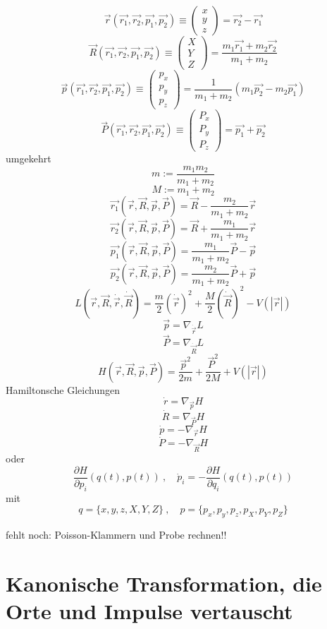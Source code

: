 \documentclass[10pt]{article} %
\begin{document}
\[ \vec{r}(\vec{r_1},\vec{r_2},\vec{p_1},\vec{p_2}) \equiv \begin{pmatrix} x \\ y \\ z \end{pmatrix} = \vec{r_2} - \vec{r_1} \]
\[ \vec{R}(\vec{r_1},\vec{r_2},\vec{p_1},\vec{p_2}) \equiv \begin{pmatrix} X \\ Y \\ Z \end{pmatrix} = \frac {m_1\vec{r_1} + m_2\vec{r_2}} {m_1 + m_2} \]
\[ \vec{p}(\vec{r_1},\vec{r_2},\vec{p_1},\vec{p_2}) \equiv \begin{pmatrix} p_x \\ p_y \\ p_z \end{pmatrix} = \frac{1}{m_1+m_2} ( m_1\vec{p_2} - m_2\vec{p_1}) \]
\[ \vec{P}(\vec{r_1},\vec{r_2},\vec{p_1},\vec{p_2}) \equiv \begin{pmatrix} P_x \\ P_y \\ P_z \end{pmatrix} = \vec{p_1} + \vec{p_2} \]
umgekehrt
\[ m := \frac{m_1 m_2}{m_1 + m_2} \]
\[ M := m_1 + m_2 \]
\[ \vec{r_1}(\vec{r},\vec{R},\vec{p},\vec{P}) = \vec{R} - \frac{m_2}{m_1 + m_2}\vec{r} \]
\[ \vec{r_2}(\vec{r},\vec{R},\vec{p},\vec{P}) = \vec{R} + \frac{m_1}{m_1 + m_2}\vec{r} \]
\[ \vec{p_1}(\vec{r},\vec{R},\vec{p},\vec{P}) = \frac{m_1}{m_1 + m_2}\vec{P} - \vec{p} \]
\[ \vec{p_2}(\vec{r},\vec{R},\vec{p},\vec{P}) = \frac{m_2}{m_1 + m_2}\vec{P} + \vec{p} \]
\[
L(\vec{r},\vec{R},\dot{\vec{r}},\dot{\vec{R}}) = 
\frac{m}{2}(\dot{\vec{r}})^2 +  \frac{M}{2}(\dot{\vec{R}})^2
- V(\left| \vec{r} \right|)
\]
\[ \vec{p} = \nabla _{\dot{\vec{r}}} L \]
\[ \vec{P} = \nabla _{\dot{\vec{R}}} L \]
\[
H(\vec{r},\vec{R},\vec{p},\vec{P}) = 
\frac{\vec{p}^2}{2m} +  \frac{\vec{P}^2}{2M}
+ V(\left| \vec{r} \right|)
\]
Hamiltonsche Gleichungen
\[ \dot{r} = \nabla_{\vec{p}} H \]
\[ \dot{R} = \nabla_{\vec{P}} H \]
\[ \dot{p} = - \nabla_{\vec{r}} H \]
\[ \dot{P} = - \nabla_{\vec{R}} H \]
oder
\[ \frac{\partial H}{\partial p_{i}}(q(t),p(t))\ ,\quad \dot{p}_{i}=-\frac{\partial H}{\partial q_{i}}(q(t),p(t)) \] 
mit
\[ q = \{ x, y, z, X, Y, Z \} \ , \quad p = \{ p_{x}, p_{y}, p_{z}, p_{X}, p_{Y}, p_{Z} \} \]

fehlt noch: Poisson-Klammern und Probe rechnen!!

\section{Kanonische Transformation, die Orte und Impulse vertauscht}
\end{document}

